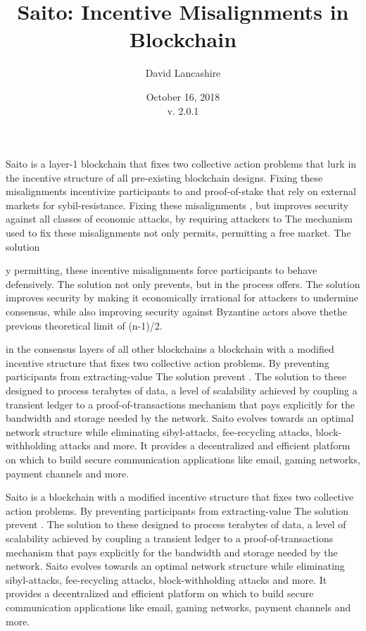 \documentclass[11.5pt, oneside]{article}   	%
\title{Saito: Incentive Misalignments in Blockchain}
\author{David Lancashire}
\date{October 16, 2018\\v. 2.0.1}
\begin{document}
\maketitle



\begin{onecolabstract}
Saito is a layer-1 blockchain that fixes two collective action problems that lurk in the incentive structure of all pre-existing blockchain designs. Fixing these misalignments incentivize participants to and proof-of-stake that rely on external markets for sybil-resistance. Fixing these misalignments , but improves security against all classes of economic attacks, by requiring attackers to The mechanism used to fix these misalignments not only permits, permitting a free market. The solution 

y permitting, these incentive misalignments force participants to behave defensively. The solution not only prevents, but in the process offers. The solution improves security by making it economically irrational for attackers to undermine consensus, while also improving security against Byzantine actors above thethe previous theoretical limit of (n-1)/2.

in the consensus layers of all other blockchains
a blockchain with a modified incentive structure that fixes two collective action problems. By preventing participants from extracting-value The solution prevent . The solution to these designed to process terabytes of data, a level of scalability achieved by coupling a transient ledger to a proof-of-transactions mechanism that pays explicitly for the bandwidth and storage needed by the network. Saito evolves towards an optimal network structure while eliminating sibyl-attacks, fee-recycling attacks, block-withholding attacks and more. It provides a decentralized and efficient platform on which to build secure communication applications like email, gaming networks, payment channels and more.

Saito is a blockchain with a modified incentive structure that fixes two collective action problems. By preventing participants from extracting-value The solution prevent . The solution to these designed to process terabytes of data, a level of scalability achieved by coupling a transient ledger to a proof-of-transactions mechanism that pays explicitly for the bandwidth and storage needed by the network. Saito evolves towards an optimal network structure while eliminating sibyl-attacks, fee-recycling attacks, block-withholding attacks and more. It provides a decentralized and efficient platform on which to build secure communication applications like email, gaming networks, payment channels and more.
\end{onecolabstract}
\end{document}
